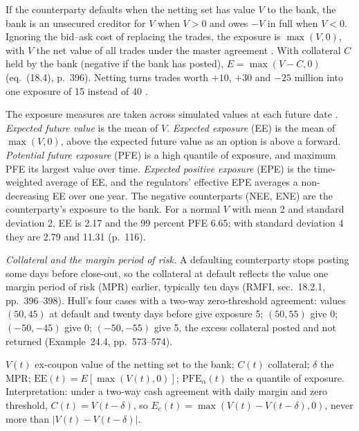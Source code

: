 \begin{qfdefinition}\label{def:counterparty-exposure-measures}
 If the counterparty defaults when the netting set has value $V$ to the bank, the bank is an unsecured creditor for $V$ when $V>0$ and owes $-V$ in full when $V<0$. Ignoring the bid--ask cost of replacing the trades, the exposure is $\max(V,0)$, with $V$ the net value of all trades under the master agreement \citep[chap.~18, sec.~18.1, pp.~394--395]{risk-management-financial-institutions-2023}. With collateral $C$ held by the bank (negative if the bank has posted), $E=\max(V-C,0)$ (eq.~(18.4), p.~396). Netting turns trades worth $+10$, $+30$ and $-25$ million into one exposure of 15 instead of 40 \citep[chap.~24, sec.~24.7, p.~574]{s7-hulloptions}.

The exposure measures are taken across simulated values at each future date \citep[chap.~7, sec.~7.2, pp.~114--119]{gregory-xva-challenge-2015}. \emph{Expected future value} is the mean of $V$. \emph{Expected exposure} (EE) is the mean of $\max(V,0)$, above the expected future value as an option is above a forward. \emph{Potential future exposure} (PFE) is a high quantile of exposure, and maximum PFE its largest value over time. \emph{Expected positive exposure} (EPE) is the time-weighted average of EE, and the regulators' effective EPE averages a non-decreasing EE over one year. The negative counterparts (NEE, ENE) are the counterparty's exposure to the bank. For a normal $V$ with mean 2 and standard deviation 2, EE is 2.17 and the 99 percent PFE 6.65; with standard deviation 4 they are 2.79 and 11.31 (p.~116).

\emph{Collateral and the margin period of risk.} A defaulting counterparty stops posting some days before close-out, so the collateral at default reflects the value one margin period of risk (MPR) earlier, typically ten days (RMFI, sec.~18.2.1, pp.~396--398). Hull's four cases with a two-way zero-threshold agreement: values $(50,45)$ at default and twenty days before give exposure 5; $(50,55)$ give 0; $(-50,-45)$ give 0; $(-50,-55)$ give 5, the excess collateral posted and not returned (Example~24.4, pp.~573--574).

 $V(t)$ ex-coupon value of the netting set to the bank; $C(t)$ collateral; $\delta$ the MPR; $\mathrm{EE}(t)=E[\max(V(t),0)]$; $\mathrm{PFE}_\alpha(t)$ the $\alpha$ quantile of exposure. Interpretation: under a two-way cash agreement with daily margin and zero threshold, $C(t)=V(t-\delta)$, so $E_c(t)=\max(V(t)-V(t-\delta),0)$, never more than $|V(t)-V(t-\delta)|$.


\end{qfdefinition}
